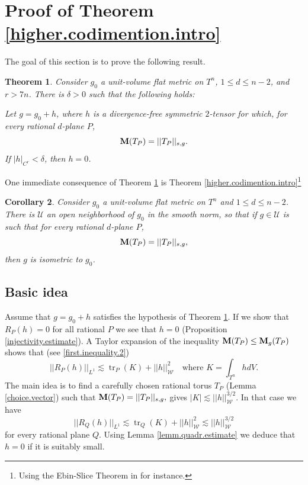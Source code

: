 \documentclass[11pt]{amsart}
\def\tr{\operatorname{tr}}
\newtheorem{thm}{Theorem}[section]
\newtheorem{cor}[thm]{Corollary}
\theoremstyle{remark}
\theoremstyle{definition}
\begin{document}
	\section{Proof of Theorem \ref{higher.codimention.intro}}
	
	The goal of this section is to prove the following result.
	\begin{thm}\label{higher.codimension.no.local.deformation2} 
		Consider $g_0$  a unit-volume flat metric on $T^n$, $1\leq d\leq n-2$, and  $r>7n$. There is $\delta>0$ such that the following holds:
		
		Let $g=g_0+h$, where $h$ is a divergence-free symmetric $2$-tensor for which, for every rational $d$-plane $P$,
		$$
		{{\bf M}(T_P)=||T_P||_{s,g}.}
		$$
		If $|h|_{C^r}<\delta$, then $h=0$.
	\end{thm}
	One immediate consequence of Theorem \ref {higher.codimension.no.local.deformation2} is {Theorem \ref{higher.codimention.intro}}\footnote{Using the Ebin-Slice Theorem in \cite[Proposition 11]{BM11} for instance.} 
	\begin{cor}\label{codimension.two.cor}
		Consider  $g_0$ a unit-volume flat metric on $T^n$ and $1\leq d\leq n-2$. There is $\mathcal U$ an  open neighborhood of $g_0$ in the smooth norm, so that if $g\in \mathcal U$ is such that for every rational $d$-plane $P$,
		$$
		{{\bf M}(T_P)=||T_P||_{s,g},}
		$$
		then $g$ is isometric to $g_0$.
	\end{cor}
	
	\subsection{Basic idea}\label{basic.idea.higher.codimension}  Assume that $g=g_0+h$ satisfies the hypothesis of Theorem \ref{higher.codimension.no.local.deformation2}.  If we show that $R_P(h)=0$ for all rational $P$ we see that $h=0$ (Proposition \ref{injectivity.estimate}). A Taylor expansion of the inequality ${\bf M}(T_P)\leq {\bf M}_{g}(T_P)$ shows that  (see \eqref{first.inequality.2})
	\begin{equation}\label{basic.idea.area}
		||R_P(h)||_{L^1}\lesssim \tr_P(K)+||h||_{\mathcal W}^2\quad\text{where }K=\int_{T^n}hdV.
	\end{equation}
	The main idea is to find a carefully chosen rational torus $T_P$ (Lemma \ref{choice.vector}) such that ${{\bf M}(T_P)=||T_P||_{s,g},}$ gives  $|K|\lesssim ||h||_{\mathcal W}^{3/2}$.  In that case we have
	$$||R_{Q}(h)||_{L^1}\lesssim \tr_Q(K)+||h||_{\mathcal W}^2\lesssim ||h||_{\mathcal W}^{3/2}$$
	for every rational plane $Q$. Using Lemma \ref{lemm.quadr.estimate} we deduce that $h=0$ if it is suitably  small.
	
\end{document}

